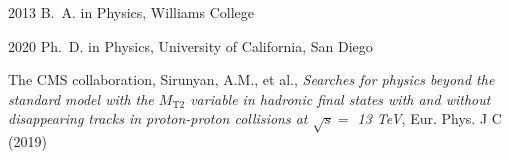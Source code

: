\begin{frontmatter}
%
%
\begin{vitapage}
\begin{vita}
  \item[2013] B.~A. in Physics, Williams College
  \item[2020] Ph.~D. in Physics, University of California, San Diego
\end{vita}
\begin{publications}
\item The CMS collaboration, Sirunyan, A.M., et al., \emph{Searches for physics beyond the standard model with the $M_\mathrm{T2}$ variable in hadronic final states with and without disappearing tracks in proton-proton collisions at $\sqrt{s}=$ 13 TeV}, Eur. Phys. J C (2019)
\end{publications}
\end{vitapage}


%
%
\begin{abstract}


\end{abstract}
\end{frontmatter}
